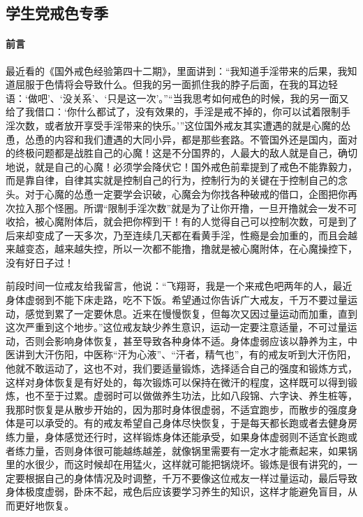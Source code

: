 \subsection{学生党戒色专季}

\paragraph*{前言}

最近看的《国外戒色经验第四十二期》，里面讲到：“我知道手淫带来的后果，我知道屈服于色情将会导致什么。但我的另一面抓住我的脖子后面，在我的耳边轻语：‘做吧’、‘没关系’、‘只是这一次’。”“当我思考如何戒色的时候，我的另一面又给了我借口：‘你什么都试了，没有效果的，手淫是戒不掉的，你可以试着限制手淫次数，或者放开享受手淫带来的快乐。’”这位国外戒友其实遭遇的就是心魔的怂恿，怂恿的内容和我们遭遇的大同小异，都是那些套路。不管国外还是国内，面对的终极问题都是战胜自己的心魔！这是不分国界的，人最大的敌人就是自己，确切地说，就是自己的心魔！必须学会降伏它！国外戒色前辈提到了戒色不能靠毅力，而是靠自律，自律其实就是控制自己的行为，控制行为的关键在于控制自己的念头。对于心魔的怂恿一定要学会识破，心魔会为你找各种破戒的借口，企图把你再次拉入那个怪圈。所谓“限制手淫次数”就是为了让你开撸，一旦开撸就会一发不可收拾，被心魔附体后，就会把你榨到干！有的人觉得自己可以控制次数，可是到了后来却变成了一天多次，乃至连续几天都在看黄手淫，性瘾是会加重的，而且会越来越变态，越来越失控，所以一次都不能撸，撸就是被心魔附体，在心魔操控下，没有好日子过！

前段时间一位戒友给我留言，他说：“飞翔哥，我是一个来戒色吧两年的人，最近身体虚弱到不能下床走路，吃不下饭。希望通过你告诉广大戒友，千万不要过量运动，感觉到累了一定要休息。近来在慢慢恢复，但每次又因过量运动而加重，直到这次严重到这个地步。”这位戒友缺少养生意识，运动一定要注意适量，不可过量运动，否则会影响身体恢复，甚至导致各种身体不适。身体虚弱应该以静养为主，中医讲到大汗伤阳，中医称“汗为心液”、“汗者，精气也”，有的戒友听到大汗伤阳，他就不敢运动了，这也不对，我们要适量锻炼，选择适合自己的强度和锻炼方式，这样对身体恢复是有好处的，每次锻炼可以保持在微汗的程度，这样既可以得到锻炼，也不至于过累。虚弱时可以做做养生功法，比如八段锦、六字诀、养生桩等，我那时恢复是从散步开始的，因为那时身体很虚弱，不适宜跑步，而散步的强度身体是可以承受的。有的戒友希望自己身体尽快恢复，于是每天都长跑或者去健身房练力量，身体感觉还行时，这样锻炼身体还能承受，如果身体虚弱则不适宜长跑或者练力量，否则身体很可能越练越差，就像锅里需要有一定水才能煮起来，如果锅里的水很少，而这时候却在用猛火，这样就可能把锅烧坏。锻炼是很有讲究的，一定要根据自己的身体情况及时调整，千万不要像这位戒友一样过量运动，最后导致身体极度虚弱，卧床不起，戒色后应该要学习养生的知识，这样才能避免盲目，从而更好地恢复。

